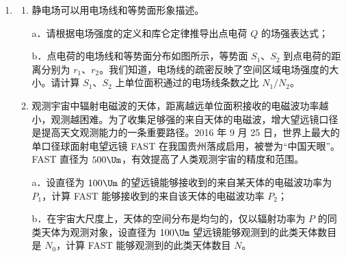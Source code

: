 \documentclass[\gkver]{gaokaozhenti}
\begin{document}
\begin{enumerate}
{（3）电动势的定义式 $E = \frac{W_{\text{非静电力}}}{q}$，由能量守恒定律，非静电力做的功等于内、外电路上产生的电热，有 $W = I^{2}rt + I^{2}Rt = Irq + IRq$，即 $IEt = I^{2}Rt + I^{2}rt$，得到 $E = Ir + IR = U_{\text{内}} + U_{\text{外}}$。
}

\item
\begin{enumerate}
	\item
	静电场可以用电场线和等势面形象描述。

	a．请根据电场强度的定义和库仑定律推导出点电荷 $Q$ 的场强表达式；

	b．点电荷的电场线和等势面分布如图所示，等势面 $S_{1}$、$S_{2}$ 到点电荷的距离分别为 $r_{1}$、$r_{2}$。我们知道，电场线的疏密反映了空间区域电场强度的大小。请计算 $S_{1}$、$S_{2}$ 上单位面积通过的电场线条数之比 $N_{1}/N_{2}$。
	\item
	观测宇宙中辐射电磁波的天体，距离越远单位面积接收的电磁波功率越小，观测越困难。为了收集足够强的来自天体的电磁波，增大望远镜口径是提高天文观测能力的一条重要路径。2016 年 9 月 25 日，世界上最大的单口径球面射电望远镜 FAST 在我国贵州落成启用，被誉为“中国天眼”。FAST 直径为 $500\Um$，有效提高了人类观测宇宙的精度和范围。

	a．设直径为 $100\Um$ 的望远镜能够接收到的来自某天体的电磁波功率为 $P_{1}$，计算 FAST 能够接收到的来自该天体的电磁波功率 $P_{2}$；

	b．在宇宙大尺度上，天体的空间分布是均匀的，仅以辐射功率为 $P$ 的同类天体为观测对象，设直径为 $100\Um$ 望远镜能够观测到的此类天体数目是 $N_{0}$，计算 FAST 能够观测到的此类天体数目 $N$。
\end{enumerate}
\onepicture[align=right, w=4.24cm]{}
\end{enumerate}
\end{document}
